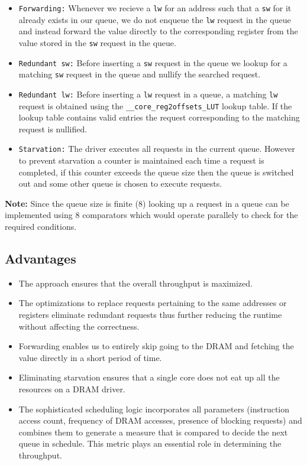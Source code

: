 \documentclass[hidelinks,12pt]{article}
\begin{document}
\begin{itemize}
    \item \verb|Forwarding:| Whenever we recieve a \verb|lw| for an address such that a \verb|sw| for it already exists in our queue, we do not enqueue the \verb|lw| request in the queue and instead forward the value directly to the corresponding register
          from the value stored in the \verb|sw| request in the queue.
    \item \verb|Redundant sw:| Before inserting a \verb|sw| request in the queue we lookup for a matching \verb|sw| request in the queue and nullify the searched request.
    \item \verb|Redundant lw:| Before inserting a \verb|lw| request in a queue, a matching \verb|lw| request is obtained using the \verb|__core_reg2offsets_LUT| lookup table.
          If the lookup table contains valid entries the request corresponding to the matching request is nullified.
    \item \verb|Starvation:| The driver executes all requests in the current queue. However to prevent starvation a counter is maintained each time a request is completed,
          if this counter exceeds the queue size then the queue is switched out and some other queue is chosen to execute requests.
\end{itemize}

\textbf{Note:} Since the queue size is finite ($8$) looking up a request in a queue can be implemented using $8$ comparators which would operate parallely to check for the required conditions.

\subsection{Advantages}
\begin{itemize}
    \item The approach ensures that the overall throughput is maximized.
    \item The optimizations to replace requests pertaining to the same addresses or registers eliminate redundant requests thus further reducing the runtime without affecting the correctness.
    \item Forwarding enables us to entirely skip going to the DRAM and fetching the value directly in a short period of time.
    \item Eliminating starvation ensures that a single core does not eat up all the resources on a DRAM driver.
    \item The sophisticated scheduling logic incorporates all parameters (instruction access count, frequency of DRAM accesses, presence of blocking requests) and combines them to generate a measure that is compared to decide the next queue in schedule. This metric plays an essential role in determining the throughput.
\end{itemize}
\end{document}
